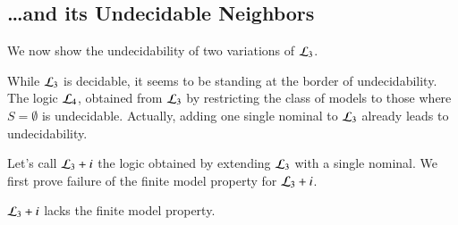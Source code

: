 
\subsection{\ldots and its Undecidable Neighbors}

We now show the undecidability of two variations of $\mathcal{L}_3$.

While $\mathcal{L}_3$ is decidable, it seems to be standing at the border
of undecidability.  The logic $\mathcal{L}_4$, obtained from $\mathcal{L}_3$ by
restricting the class of models to those where $S=\emptyset$ is
undecidable.  Actually, adding one single nominal to $\mathcal{L}_3$
already leads to undecidability.

Let's call $\mathcal{L}_3 + i$ the logic obtained by extending
$\mathcal{L}_3$ with a single nominal. We first prove failure of
the finite model property for $\mathcal{L}_3 + i$.

\begin{thm}\label{thm:tlmi:inf}
$\mathcal{L}_3 + i$ lacks the finite model property.
\end{thm}

